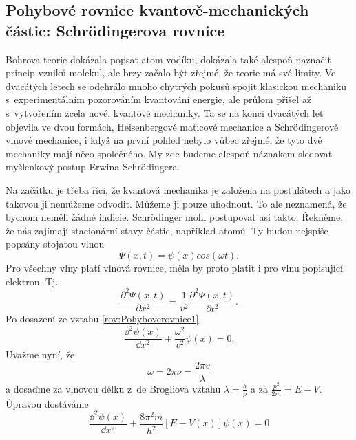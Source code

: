 \subsection{Pohybové rovnice kvantově-mechanických částic: Schr\"odingerova rovnice}

Bohrova teorie dokázala popsat atom vodíku, dokázala také alespoň naznačit princip vzniků molekul, ale brzy začalo být zřejmé, že teorie má své limity. Ve dvacátých letech se odehrálo mnoho chytrých pokusů spojit klasickou mechaniku s~experimentálním pozorováním kvantování energie, ale průlom přišel až s~vytvořením zcela nové, kvantové mechaniky. Ta se na konci dvacátých let objevila ve dvou formách, Heisenbergově maticové mechanice a Schr\"odingerově vlnové mechanice, i když na první pohled nebylo vůbec zřejmé, že tyto dvě mechaniky mají něco společného. My zde budeme alespoň náznakem sledovat myšlenkový postup Erwina Schr\"odingera.

Na začátku je třeba říci, že kvantová mechanika je založena na postulátech a jako takovou ji nemůžeme odvodit. Můžeme ji pouze uhodnout. To ale neznamená, že bychom neměli žádné indicie. 
Schr\"odinger mohl postupovat asi takto. Řekněme, že nás zajímají stacionární stavy částic, například atomů. Ty budou nejspíše popsány stojatou vlnou
\begin{equation}
\Psi(x,t) = \psi(x)cos(\omega t)\mbox{.}
\label{rov:Pohyboverovnice1}
\end{equation}
Pro všechny vlny platí vlnová rovnice, měla by proto platit i pro vlnu popisující elektron. Tj.
\begin{equation}
\frac{\partial^2\Psi(x,t)}{\partial x^2} = \frac{1}{v^2}\frac{\partial^2\Psi(x,t)}{\partial t^2}\mbox{.}
\label{rov:Pohyboverovnice2}
\end{equation}
\noindent Po dosazení ze vztahu \ref{rov:Pohyboverovnice1}
\begin{equation}
\frac{\dd^2\psi(x)}{\dd x^2} + \frac{\omega^2}{v^2}\psi(x) = 0 \mbox{.}
\label{rov:Pohyboverovnice3}
\end{equation}
\noindent Uvažme nyní, že
\begin{equation}
\omega = 2\pi\nu = \frac{2\pi v}{\lambda}
\label{rov:Pohyboverovnice4}
\end{equation}
\noindent a dosaďme za vlnovou délku z~de Brogliova vztahu $\lambda = \frac{h}{p}$ a za $\frac{p^2}{2m}=E-V$.
Úpravou dostáváme
\begin{equation}
\frac{\dd^2\psi(x)}{\dd x^2} + \frac{8\pi^2 m}{h^2}[E - V(x)]\psi(x) = 0 
\label{rov:Pohyboverovnice5}
\end{equation}

